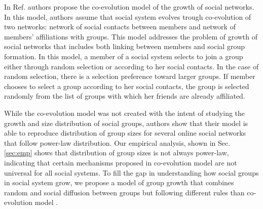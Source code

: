 In Ref. \cite{zheleva2009co} authors propose the co-evolution model of the growth of social networks. In this model, authors assume that social system evolves trough co-evolution of two networks: network of social contacts between members and network of members' affiliations with groups. This model addresses the problem of growth of social networks that includes both linking between members and social group formation. In this model, a member of a social system selects to join a group either through random selection or according to her social contacts. In the case of random selection, there is a selection preference toward larger groups. If member chooses to select a group according to her social contacts, the group is selected randomly from the list of groups with which her friends are already affiliated.

While the co-evolution model \cite{zheleva2009co} was not created with the intent of studying the growth and size distribution of social groups, authors show that their model is able to reproduce distribution of group sizes for several online social networks that follow power-law distribution. Our empirical analysis, shown in Sec. \ref{sec:emp} shows that distribution of group sizes is not always power-law, indicating that certain mechanisms proposed in co-evolution model are not universal for all social systems. To fill the gap in understanding how social groups in social system grow, we propose a model of group growth that combines random and social diffusion between groups but following different rules than co-evolution model \cite{zheleva2009co}.\\

